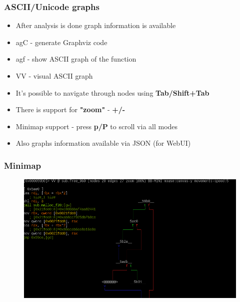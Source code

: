\documentclass[10pt,pdf,utf8,english,compress,hyperref={unicode}]{beamer}
\begin{document}
\begin{frame}[fragile]
  \frametitle{ASCII/Unicode graphs}
  \begin{itemize}
	  \item After analysis is done graph information is available
	  \item \alert{agC} - generate Graphviz code
	  \item \alert{agf} - show ASCII graph of the function
	  \item \alert{VV} - visual ASCII graph
	  \item It's possible to navigate through nodes using \textbf{Tab/Shift+Tab}
	  \item There is support for \textbf{"zoom"} - \textbf{+/-}
	  \item Minimap support - press \textbf{p/P} to scroll via all modes
	  \item Also graphs information available via JSON (for WebUI)
  \end{itemize}
\end{frame}

\begin{frame}[fragile]
	\frametitle{Minimap}
	\begin{figure}
		\includegraphics[width=\linewidth]{r2minimap.png}
	\end{figure}
\end{frame}
\end{document}
